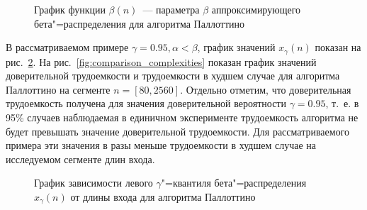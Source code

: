 \documentclass[a4paper, article, 14pt]{extarticle}
\begin{document}
\begin{figure}[h]
	\caption{График функции $\beta(n)$~--- параметра $\beta$ аппроксимирующего бета"=распределения для алгоритма Паллоттино}
	\label{fig:beta_plot}
\end{figure}

В рассматриваемом примере $\gamma = 0.95, \alpha < \beta$, график значений $x_\gamma(n)$ показан на рис.~\ref{fig:left_quantile}. На рис.~\ref{fig:comparison_complexities} показан график значений доверительной трудоемкости и трудоемкости в худшем случае для алгоритма Паллоттино на сегменте $n = [80, 2560]$. Отдельно отметим, что доверительная трудоемкость получена для значения доверительной вероятности $\gamma = 0.95$, т.~е. в 95\% случаев наблюдаемая в единичном эксперименте трудоемкость алгоритма не будет превышать значение доверительной трудоемкости. Для рассматриваемого примера эти значения в разы меньше трудоемкости в худшем случае на исследуемом сегменте длин входа.

\begin{figure}[h]
	\caption{График зависимости левого $\gamma$"=квантиля бета"=распределения $x_\gamma(n)$ от длины входа для алгоритма Паллоттино}
	\label{fig:left_quantile}
\end{figure}
\end{document}
